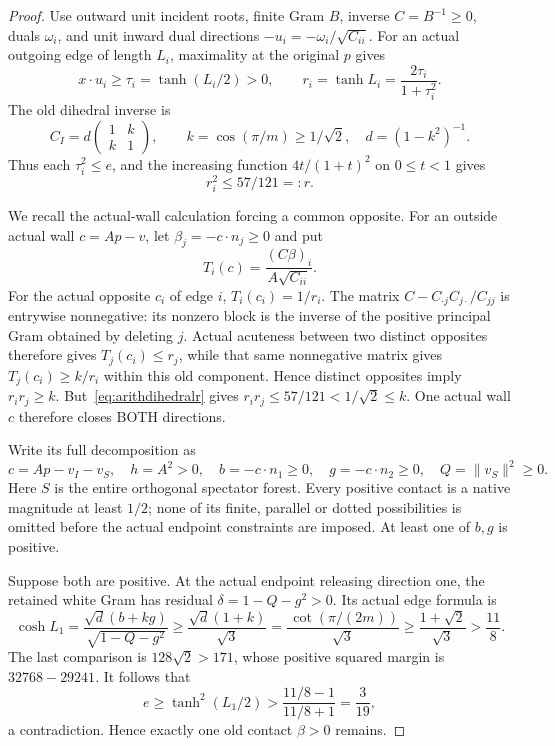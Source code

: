 \documentclass[11pt]{article}
\begin{document}
\begin{proof}
Use outward unit incident roots, finite Gram \(B\), inverse
\(C=B^{-1}\ge0\), duals \(\omega_i\), and unit inward dual
directions \(-u_i=-\omega_i/\sqrt{C_{ii}}\).
For an actual outgoing edge of length \(L_i\), maximality at
the original \(p\) gives
\[
 x\cdot u_i\ge\tau_i=\tanh(L_i/2)>0,\qquad
 r_i=\tanh L_i={\frac{2\tau_i}{1+\tau_i^2}}.
\]
The old dihedral inverse is
\[
 C_I=d\begin{pmatrix}1&k\\k&1\end{pmatrix},\qquad
 k=\cos(\pi/m)\ge1/\sqrt2,\quad d=(1-k^2)^{-1}.
\]
Thus each \(\tau_i^2\le e\), and the increasing function
\(4t/(1+t)^2\) on \(0\le t<1\) gives
\[
                         r_i^2\le57/121=:r .
\tag{Dih1}\label{eq:arithdihedralr}
\]

We recall the actual-wall calculation forcing a common opposite.
For an outside actual wall \(c=Ap-v\), let
\(\beta_j=-c\cdot n_j\ge0\) and put
\[
 T_i(c)={\frac{(C\beta)_i}{A\sqrt{C_{ii}}}}.
\]
For the actual opposite \(c_i\) of edge \(i\),
\(T_i(c_i)=1/r_i\).
The matrix
\(C-C_{\cdot j}C_{j\cdot}/C_{jj}\)
is entrywise nonnegative: its nonzero block is the inverse of
the positive principal Gram obtained by deleting \(j\).
Actual acuteness between two distinct opposites therefore gives
\(T_j(c_i)\le r_j\), while that same nonnegative matrix gives
\(T_j(c_i)\ge k/r_i\) within this old component.
Hence distinct opposites imply \(r_ir_j\ge k\).
But~\eqref{eq:arithdihedralr} gives
\(r_ir_j\le57/121<1/\sqrt2\le k\).
One actual wall \(c\) therefore closes BOTH directions.

Write its full decomposition as
\[
 c=Ap-v_I-v_S,\quad h=A^2>0,\quad
 b=-c\cdot n_1\ge0,\quad g=-c\cdot n_2\ge0,\quad
 Q=\|v_S\|^2\ge0 .
\]
Here \(S\) is the entire orthogonal spectator forest.
Every positive contact is a native magnitude at least \(1/2\);
none of its finite, parallel or dotted possibilities is omitted
before the actual endpoint constraints are imposed.
At least one of \(b,g\) is positive.

Suppose both are positive.
At the actual endpoint releasing direction one, the retained
white Gram has residual \(\delta=1-Q-g^2>0\).
Its actual edge formula is
\[
 \cosh L_1={\frac{\sqrt d(b+kg)}{\sqrt{1-Q-g^2}}}
 \ge{\frac{\sqrt d(1+k)}{\sqrt3}}
 ={\frac{\,\cot(\pi/(2m))}{\sqrt3}}
 \ge{\frac{1+\sqrt2}{\sqrt3}}>{\frac{11}{8}}.
\]
The last comparison is \(128\sqrt2>171\), whose positive
squared margin is \(32768-29241\).
It follows that
\[
 e\ge\tanh^2(L_1/2)>
 {\frac{11/8-1}{11/8+1}}={\frac{3}{19}},
\]
a contradiction.  Hence exactly one old contact \(\beta>0\)
remains.


\end{proof}
\end{document}

